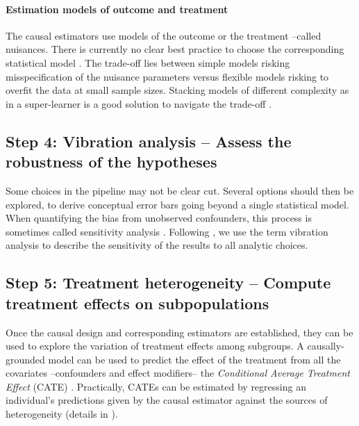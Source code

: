 \documentclass[10pt,letterpaper]{article}
\begin{document}
\paragraph{Estimation models of outcome and treatment}

The causal estimators use models of the outcome or the treatment --called
nuisances. There is currently no clear best practice to choose the corresponding
statistical model \cite{wendling2018comparing, dorie2019automated}. The
trade-off lies between simple models risking misspecification of the nuisance
parameters versus flexible models risking to overfit the data at small sample
sizes. Stacking models of different complexity as in a super-learner is a good
solution to navigate the trade-off \cite{van2007super,doutreligne2023select}.

\subsection*{Step 4: Vibration analysis -- Assess the robustness of the hypotheses}\label{sec:vibration_analysis}

Some choices in the pipeline may not be clear cut. Several options should then
be explored, to derive conceptual error bars going beyond a single statistical
model. When quantifying the bias from unobserved confounders, this process is
sometimes called sensitivity analysis \cite{schneeweiss2006sensitivity,thabane2013tutorial,fda_statistical_2021}.
Following \cite{patel2015assessment}, we use the term vibration analysis to
describe the sensitivity of the results to all analytic choices.

\subsection*{Step 5: Treatment heterogeneity -- Compute treatment effects on subpopulations}\label{sec:treatment_heterogeneity}

Once the causal design and corresponding estimators are established, they can be
used to explore the variation of treatment effects among subgroups. A
causally-grounded model can be used to predict the effect of the treatment from
all the covariates --confounders and effect modifiers-- the \emph{Conditional Average
  Treatment Effect} (CATE) \cite{robertson2021assessing}. Practically, CATEs can be estimated by regressing
an individual's predictions given by the causal estimator against the sources of
heterogeneity (details in ).
\end{document}
